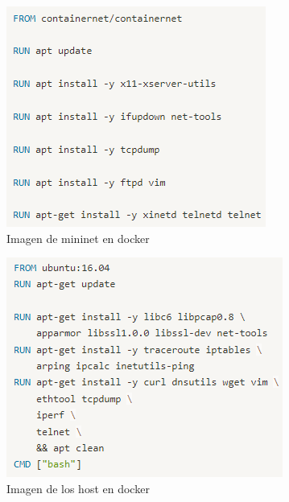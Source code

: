 \documentclass[10pt]{article}
\begin{document}
\begin{multicols}{2}
\begin{figure}[H]
    \centering
    \includegraphics[width=0.8\linewidth]{Imagenes/dockerfile_mininet.png}
    \caption{Imagen de mininet en docker}
    \label{fig:dockerfile_mininet}
\end{figure}

\columnbreak

\begin{figure}[H]
    \centering
    \includegraphics[width=0.8\linewidth]{Imagenes/dockerfile_host.png}
    \caption{Imagen de los host en docker}
    \label{fig:docker_run01}
\end{figure}

\end{multicols}
\end{document}
